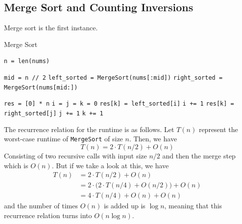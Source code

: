 \documentclass{article}
\begin{document}
  \subsection{Merge Sort and Counting Inversions}

    \begin{algo}
      Merge sort is the first instance. 
      \begin{algorithm}[H]
        \caption{Merge Sort}
        \label{alg:merge_sort}
        \begin{algorithmic}
            \State \texttt{n = len(nums)}

             
              \State {}
            \EndIf
            \State \texttt{mid = n // 2} 
            \State \texttt{left\_sorted = MergeSort(nums[:mid])} 
            \State \texttt{right\_sorted = MergeSort(nums[mid:])} 

            \State \texttt{res = [0] * n} 
            \State \texttt{i = j = k = 0} 
             
                \State \texttt{res[k] = left\_sorted[i]} 
                \State \texttt{i += 1} 
              \Else 
                \State \texttt{res[k] = right\_sorted[j]}
                \State \texttt{j += 1}
              \EndIf 
              \State \texttt{k += 1}
            \EndWhile

            \State {}
          \EndFunction
        \end{algorithmic}
      \end{algorithm}
      The recurrence relation for the runtime is as follows. Let $T(n)$ represent the worst-case runtime of \texttt{MergeSort} of size $n$. Then, we have 
      \begin{equation}
        T(n) = 2 \cdot T(n/2) + O(n)
      \end{equation}
      Consisting of two recursive calls with input size $n/2$ and then the merge step which is $O(n)$. But if we take a look at this, we have 
      \begin{align}
        T(n) & = 2 \cdot T(n/2) + O(n) \\
             & = 2 \cdot \big( 2 \cdot T(n/4) + O(n/2)) + O(n) \\
             & = 4 \cdot T(n/4) + O(n) + O(n) 
      \end{align}
      and the number of times $O(n)$ is added up is $\log{n}$, meaning that this recurrence relation turns into $O(n \log{n})$. 
    \end{algo}
\end{document}

